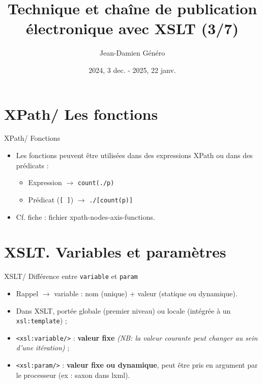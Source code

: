 \documentclass{beamer}
\title{Technique et chaîne de publication électronique avec XSLT (3/7)}
\date{2024, 3 dec. - 2025, 22 janv.}
\author{Jean-Damien Généro}
\institute{École nationale des chartes -- M2 TNAH}
\begin{document}
    \maketitle
    
    \section{XPath/ Les fonctions}

    \begin{frame}{XPath/ Fonctions}
        \Large
        \begin{itemize}
            \item Les fonctions peuvent être utilisées dans des expressions XPath ou dans des prédicats :
            \begin{itemize}
            \Large
                \item Expression $\rightarrow$ \texttt{count(./p)}
                \item Prédicat (\texttt{[ ]}) $\rightarrow$ \texttt{./[count(p)]}
            \end{itemize}
            \bigskip
            \item Cf. fiche : fichier xpath-nodes-axis-functions.
        \end{itemize}
    \end{frame}
    
    \section{XSLT. Variables et paramètres}

    \begin{frame}{XSLT/ Différence entre \texttt{variable} et \texttt{param}}
        \Large
        \begin{itemize}
            \item Rappel $\rightarrow$ variable : nom (unique) + valeur (statique ou dynamique).
            \bigskip
            \item Dans XSLT, portée globale (premier niveau) ou locale (intégrée à un \texttt{xsl:template}) ;
            \bigskip
            \item \texttt{<xsl:variable/>} : \textbf{valeur fixe} \textit{(NB: la valeur courante peut changer au sein d'une itération)} ;
            \bigskip
            \item \texttt{<xsl:param/>} : \textbf{valeur fixe ou dynamique}, peut être pris en argument par le processeur (ex : saxon dans lxml).
        \end{itemize}
    \end{frame}
\end{document}
